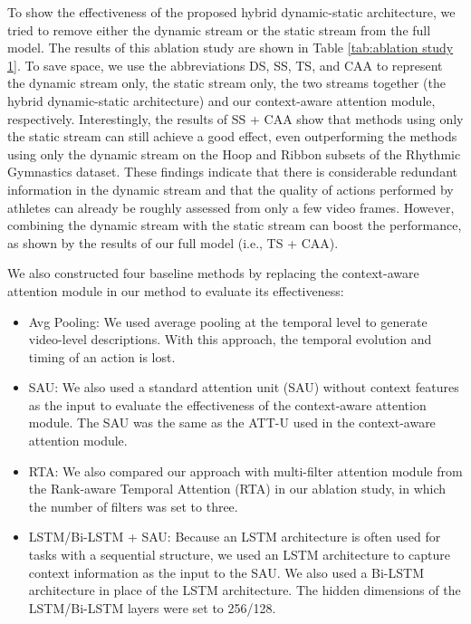 \documentclass[sigconf]{acmart}
\begin{document}
To show the effectiveness of the proposed hybrid dynamic-static architecture, we tried to remove either the dynamic stream or the static stream from the full model. The results of this ablation study are shown in Table \ref{tab:ablation study 1}. To save space, we use the abbreviations DS, SS, TS, and CAA to represent the dynamic stream only, the static stream only, the two streams together (the hybrid dynamic-static architecture) and our context-aware attention module, respectively. Interestingly, the results of SS + CAA show that methods using only the static stream can still achieve a good effect, even outperforming the methods using only the dynamic stream on the Hoop and Ribbon subsets of the Rhythmic Gymnastics dataset. These findings indicate that there is considerable redundant information in the dynamic stream and that the quality of actions performed by athletes can already be roughly assessed from only a few video frames. However, combining the dynamic stream with the static stream can boost the performance, as shown by the results of our full model (i.e., TS + CAA). 

\vspace{5pt}

We also constructed four baseline methods by replacing the context-aware attention module in our method to evaluate its effectiveness:
\begin{itemize}
\item  Avg Pooling: We used average pooling at the temporal level to generate video-level descriptions. With this approach, the temporal evolution and timing of an action is lost.
\item SAU: We also used a standard attention unit (SAU) without context features as the input to evaluate the effectiveness of the context-aware attention module. The SAU was the same as the ATT-U used in the context-aware attention module.
\item RTA: We also compared our approach with multi-filter attention module from the  Rank-aware Temporal Attention (RTA) \cite{doughty2019pros} in our ablation study, in which the number of filters was set to three.
\item LSTM/Bi-LSTM + SAU: Because an LSTM architecture is often used for tasks with a sequential structure, we used an LSTM architecture to capture context information as the input to the SAU. We also used a Bi-LSTM architecture in place of the LSTM architecture. The hidden dimensions of the LSTM/Bi-LSTM layers were set to 256/128.
\end{itemize}
\end{document}
